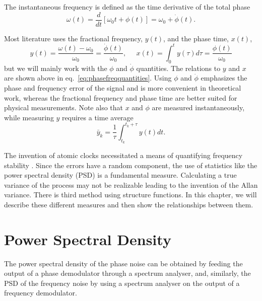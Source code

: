 The instantaneous frequency is defined as the time derivative of the total phase
%
\begin{equation}
	\omega(t) = \frac{d}{dt}\left[ \omega_0t + \phi(t)\right] = \omega_0 + \dot{\phi}(t).
\end{equation}
%

Most literature uses the fractional frequency, $y(t)$, and the phase time, $x(t)$,
%
\begin{equation}
\label{eq:phasefreqquantities}
y(t) = \frac{\omega(t) - \omega_0}{\omega_0} = \frac{\dot{\phi}(t)}{\omega_0}, \;\;\;\;\; x(t) = \int_0^t y(\tau)d\tau = \frac{\phi(t)}{\omega_0}
\end{equation}
%
but we will mainly work with the $\phi$ and $\dot{\phi}$ quantities. The relations to $y$ and $x$ are shown above in eq.~\ref{eq:phasefreqquantities}. Using $\phi$ and $\dot{\phi}$ emphasizes the phase and frequency error of the signal and is more convenient in theoretical work, whereas the fractional frequency and phase time are better suited for physical measurements. Note also that $x$ and $\phi$ are measured instantaneously, while measuring $y$ requires a time average
%
\begin{equation} \label{eq:avgy}
\bar{y}_k = \frac{1}{\tau}\int_{t_k}^{t_k+\tau} y(t)dt.
\end{equation}

The invention of atomic clocks necessitated a means of quantifying frequency stability \cite{Allan1974} \cite{Rutman1977}. Since the errors have a random component, the use of statistics like the power spectral density (PSD) is a fundamental measure. Calculating a true variance of the process may not be realizable leading to the invention of the Allan variance. There is third method using structure functions. In this chapter, we will describe these different measures and then show the relationships between them.

\section{Power Spectral Density} \label{sec:psd}

The power spectral density of the phase noise can be obtained by feeding the output of a phase demodulator through a spectrum analyser, and, similarly, the PSD of the frequency noise by using a spectrum analyser on the output of a frequency demodulator.

